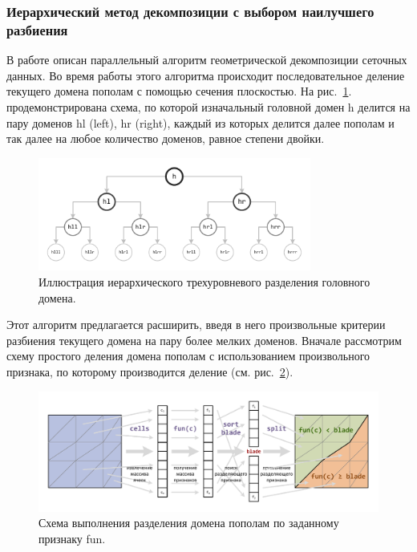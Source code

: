 \subsubsection{Иерархический метод декомпозиции с выбором наилучшего разбиения}\label{sec:text_2_decompsurf_hierarchical}

В работе \cite{Golovchenko2020Decomp} описан параллельный алгоритм геометрической декомпозиции сеточных данных.
Во время работы этого алгоритма происходит последовательное деление текущего домена пополам с помощью сечения плоскостью.
На рис.~\ref{fig:text_2_decompsurf_hierarchical}. продемонстрирована схема, по которой изначальный головной домен h делится на пару доменов hl (left), hr (right), каждый из которых делится далее пополам и так далее на любое количество доменов, равное степени двойки.

\begin{figure}[h]
	\centering
	\includegraphics[width=0.8\textwidth]{./pics/text_2_decompsurf/hierarchical.pdf}
	\caption{Иллюстрация иерархического трехуровневого разделения головного домена.}
	\label{fig:text_2_decompsurf_hierarchical}
\end{figure}

Этот алгоритм предлагается расширить, введя в него произвольные критерии разбиения текущего домена на пару более мелких доменов.
Вначале рассмотрим схему простого деления домена пополам с использованием произвольного признака, по которому производится деление (см. рис.~\ref{fig:text_2_decompsurf_split}).

\begin{figure}[h]
	\centering
	\includegraphics[width=1.0\textwidth]{./pics/text_2_decompsurf/split.pdf}
	\caption{Схема выполнения разделения домена пополам по заданному признаку fun.}
	\label{fig:text_2_decompsurf_split}
\end{figure}


